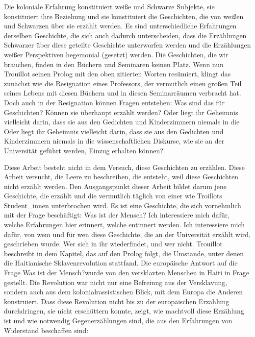Die koloniale Erfahrung konstituiert weiße und Schwarze Subjekte, sie
konstituiert ihre Beziehung und sie konstituiert die Geschichten, die von weißen
und Schwarzen über sie erzählt werden. Es sind unterschiedliche Erfahrungen
derselben Geschichte, die sich auch dadurch unterscheiden, dass die Erzählungen
Schwarzer über diese geteilte Geschichte unterworfen werden und die Erzählungen
weißer Perspektiven hegemonial (gesetzt) werden.  Die Geschichten, die wir
brauchen, finden in den Büchern und Seminaren keinen Platz.  Wenn nun Trouillot
seinen Prolog mit den oben zitierten Worten resümiert, klingt das zunächst wie
die Resignation eines Professors, der vermutlich einen großen Teil seines Lebens
mit diesen Büchern und in diesen Seminarräumen verbracht hat. Doch auch in der
Resignation können Fragen entstehen: Was sind das für Geschichten? Können sie
überhaupt erzählt werden? Oder liegt ihr Geheimnis vielleicht darin, dass sie
aus den Gedichten und Kinderzimmern niemals in die Oder liegt ihr Geheimnis
vielleicht darin, dass sie aus den Gedichten und Kinderzimmern niemals in die
wissenschaftlichen Diskurse, wie sie an der Universität geführt werden, Einzug
erhalten können?

Diese Arbeit besteht nicht in dem Versuch, diese Geschichten zu erzählen. Diese
Arbeit versucht, die Leere zu beschreiben, die entsteht, weil diese Geschichten
nicht erzählt werden.  Den Ausgangspunkt dieser Arbeit bildet darum jene
Geschichte, die erzählt und die vermutlich täglich von einer wie Troillots
Student\_innen unterbrochen wird. Es ist eine Geschichte, die sich vornehmlich
mit der Frage beschäftigt: Was ist der Mensch?  Ich interessiere mich dafür,
welche Erfahrungen hier erinnert, welche entinnert werden. Ich interessiere mich
dafür, von wem und für wen diese Geschichte, die an der Universität erzählt
wird, geschrieben wurde. Wer sich in ihr wiederfindet, und wer nicht.  Trouillot
beschreibt in dem Kapitel, das auf den Prolog folgt, die Umstände, unter denen
die Haitianische Sklavenrevolution stattfand. Die europäische Antwort auf die
Frage \glqq Was ist der Mensch?\grqq wurde von den versklavten Menschen in Haiti in Frage
gestellt. Die Revolution war nicht nur eine Befreiung aus der Versklavung,
sondern auch aus dem kolonialrassistischen Blick, mit dem Europa die Anderen
konstruiert. Dass diese Revolution nicht bis zu der europäischen Erzählung
durchdringen, sie nicht erschüttern konnte, zeigt, wie machtvoll diese Erzählung
ist und wie notwendig Gegenerzählungen sind, die aus den Erfahrungen von
Widerstand beschaffen sind:


